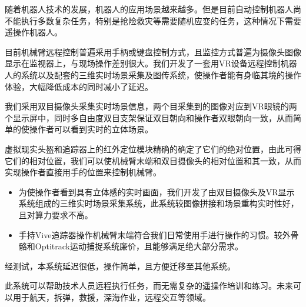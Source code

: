 % 
% 
\begin{cabstract}
随着机器人技术的发展，机器人的应用场景越来越多。但是目前自动控制机器人尚不能执行多数复杂任务，特别是抢险救灾等需要随机应变的任务，这种情况下需要遥操作机器人。

目前机械臂远程控制普遍采用手柄或键盘控制方式，且监控方式普遍为摄像头图像显示在监视器上，与现场操作差别很大。我们开发了一套用VR设备远程控制机器人的系统以及配套的三维实时场景采集及图传系统，使操作者能有身临其境的操作体验，大幅降低成本的同时减小了延迟。

我们采用双目摄像头采集实时场景信息，两个目采集到的图像对应到VR眼镜的两个显示屏中，同时多自由度双目支架保证双目朝向和操作者双眼朝向一致，从而简单的使操作者可以看到实时的立体场景。

虚拟现实头盔和追踪器上的红外定位模块精确的确定了它们的绝对位置，由此可得它们的相对位置，我们可以使机械臂末端和双目摄像头的相对位置和其一致，从而实现操作者直接用手的位置来控制机械臂。

  \begin{itemize}
    \item 为使操作者看到具有立体感的实时画面，我们开发了由双目摄像头及VR显示系统组成的三维实时场景采集系统，此系统较图像拼接和场景重构实时性好，且对算力要求不高。
    \item 手持Vive追踪器操作机械臂末端符合我们日常使用手进行操作的习惯。较外骨骼和Optitrack运动捕捉系统廉价，且能够满足绝大部分需求。
  \end{itemize}

经测试，本系统延迟很低，操作简单，且方便迁移至其他系统。

此系统可以帮助技术人员远程执行任务，而无需复杂的遥操作培训和练习。未来可以用于航天，拆弹，救援，深海作业，远程交互等领域。



\end{cabstract}


